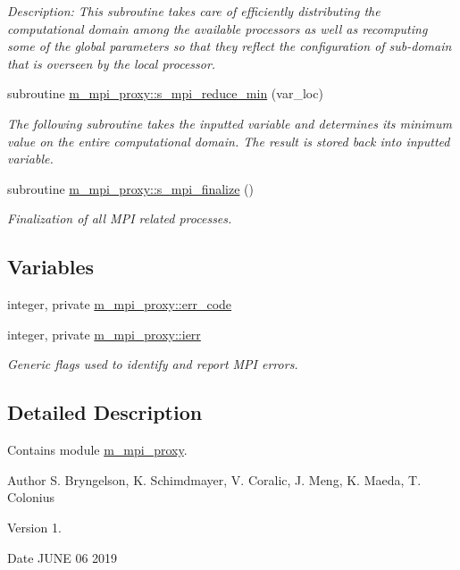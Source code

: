 \begin{DoxyCompactItemize}
\begin{DoxyCompactList}\small\item\em Description\+: This subroutine takes care of efficiently distributing the computational domain among the available processors as well as recomputing some of the global parameters so that they reflect the configuration of sub-\/domain that is overseen by the local processor. \end{DoxyCompactList}\item 
subroutine \hyperlink{namespacem__mpi__proxy_ad02d11c9b94b9354f7d8234937bb27a2}{m\+\_\+mpi\+\_\+proxy\+::s\+\_\+mpi\+\_\+reduce\+\_\+min} (var\+\_\+loc)
\begin{DoxyCompactList}\small\item\em The following subroutine takes the inputted variable and determines its minimum value on the entire computational domain. The result is stored back into inputted variable. \end{DoxyCompactList}\item 
subroutine \hyperlink{namespacem__mpi__proxy_a43fbda10c02ec8bc1fc572c83090f2e5}{m\+\_\+mpi\+\_\+proxy\+::s\+\_\+mpi\+\_\+finalize} ()
\begin{DoxyCompactList}\small\item\em Finalization of all M\+PI related processes. \end{DoxyCompactList}\end{DoxyCompactItemize}
\subsection*{Variables}
\begin{DoxyCompactItemize}
\item 
integer, private \hyperlink{namespacem__mpi__proxy_ae5709407e3600d19d79b183e409bb982}{m\+\_\+mpi\+\_\+proxy\+::err\+\_\+code}
\item 
integer, private \hyperlink{namespacem__mpi__proxy_a306ba163b09cfc692125f2c0ba82ef8c}{m\+\_\+mpi\+\_\+proxy\+::ierr}
\begin{DoxyCompactList}\small\item\em Generic flags used to identify and report M\+PI errors. \end{DoxyCompactList}\end{DoxyCompactItemize}


\subsection{Detailed Description}
Contains module \hyperlink{namespacem__mpi__proxy}{m\+\_\+mpi\+\_\+proxy}. 

\begin{DoxyAuthor}{Author}
S. Bryngelson, K. Schimdmayer, V. Coralic, J. Meng, K. Maeda, T. Colonius 
\end{DoxyAuthor}
\begin{DoxyVersion}{Version}
1. 
\end{DoxyVersion}
\begin{DoxyDate}{Date}
J\+U\+NE 06 2019 
\end{DoxyDate}
